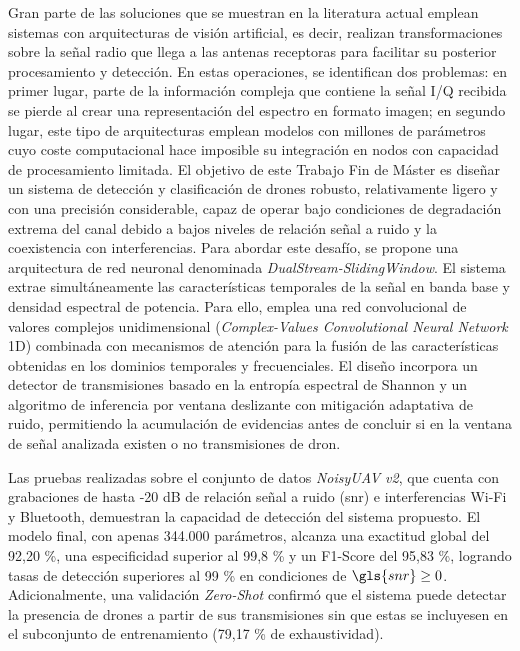 Gran parte de las soluciones que se muestran en la literatura actual emplean sistemas con arquitecturas de visión artificial, es decir, realizan transformaciones sobre la señal radio que llega a las antenas receptoras para facilitar su posterior procesamiento y detección. En estas operaciones, se identifican dos problemas: en primer lugar, parte de la información compleja que contiene la señal I/Q recibida se pierde al crear una representación del espectro en formato imagen; en segundo lugar, este tipo de arquitecturas emplean modelos con millones de parámetros cuyo coste computacional hace imposible su integración en nodos con capacidad de procesamiento limitada. El objetivo de este Trabajo Fin de Máster es diseñar un sistema de detección y clasificación de drones robusto, relativamente ligero y con una precisión considerable, capaz de operar bajo condiciones de degradación extrema del canal debido a bajos niveles de relación señal a ruido y la coexistencia con interferencias.
Para abordar este desafío, se propone una arquitectura de red neuronal denominada \textit{DualStream-SlidingWindow}. El sistema extrae simultáneamente las características temporales de la señal en banda base y densidad espectral de potencia. Para ello, emplea una red convolucional de valores complejos unidimensional (\textit{Complex-Values Convolutional Neural Network} 1D) combinada con mecanismos de atención para la fusión de las características obtenidas en los dominios temporales y frecuenciales. El diseño incorpora un detector de transmisiones basado en la entropía espectral de Shannon y un algoritmo de inferencia por ventana deslizante con mitigación adaptativa de ruido, permitiendo la acumulación de evidencias antes de concluir si en la ventana de señal analizada existen o no transmisiones de dron.

Las pruebas realizadas sobre el conjunto de datos \textit{NoisyUAV v2}, que cuenta con grabaciones de hasta -20 dB de relación señal a ruido (\gls{snr}) e interferencias Wi-Fi y Bluetooth, demuestran la capacidad de detección del sistema propuesto. El modelo final, con apenas 344.000 parámetros, alcanza una exactitud global del 92,20 \%, una especificidad superior al 99,8 \% y un F1-Score del 95,83 \%, logrando tasas de detección superiores al 99 \% en condiciones de $\gls{snr} \ge 0$. Adicionalmente, una validación \textit{Zero-Shot} confirmó que el sistema puede detectar la presencia de drones a partir de sus transmisiones sin que estas se incluyesen en el subconjunto de entrenamiento (79,17 \% de exhaustividad). 

